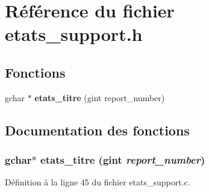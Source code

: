 \section{Référence du fichier etats\_\-support.h}
\label{etats__support_8h}
\subsection*{Fonctions}
\begin{DoxyCompactItemize}
\item 
gchar $\ast$ {\bf etats\_\-titre} (gint report\_\-number)
\end{DoxyCompactItemize}


\subsection{Documentation des fonctions}
\subsubsection[{etats\_\-titre}]{\setlength{\rightskip}{0pt plus 5cm}gchar$\ast$ etats\_\-titre (gint {\em report\_\-number})}\label{etats__support_8h_afebb1d8c6e6cc8825f96e411d2b9e618}


Définition à la ligne 45 du fichier etats\_\-support.c.

